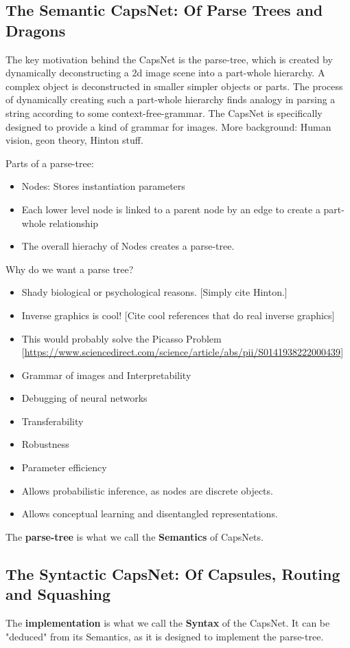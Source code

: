 \documentclass{article}
\begin{document}
\subsection{The Semantic CapsNet: Of Parse Trees and Dragons}

The key motivation behind the CapsNet is the parse-tree, which is created by dynamically deconstructing a 2d image scene into a part-whole hierarchy. A complex object is deconstructed in smaller simpler objects or parts.
The process of dynamically creating such a part-whole hierarchy finds analogy in parsing a string according to some context-free-grammar.
The CapsNet is specifically designed to provide a kind of grammar for images.
More background: Human vision, geon theory, Hinton stuff.

Parts of a parse-tree:
\begin{itemize}
	\item Nodes: Stores instantiation parameters
	\item Each lower level node is linked to a parent node by an edge to create a part-whole relationship
	\item The overall hierachy of Nodes creates a parse-tree.
\end{itemize}
Why do we want a parse tree?
\begin{itemize}
	\item Shady biological or psychological reasons. [Simply cite Hinton.]
	\item Inverse graphics is cool! [Cite cool references that do real inverse graphics]
	\item This would probably solve the Picasso Problem [\url{https://www.sciencedirect.com/science/article/abs/pii/S0141938222000439}]
	\item Grammar of images and Interpretability
	\item Debugging of neural networks
	\item Transferability
	\item Robustness
	\item Parameter efficiency
	\item Allows probabilistic inference, as nodes are discrete objects.
	\item Allows conceptual learning and disentangled representations.
\end{itemize}

The \textbf{parse-tree} is what we call the \textbf{Semantics} of CapsNets.

\subsection{The Syntactic CapsNet: Of Capsules, Routing and Squashing}
The \textbf{implementation} is what we call the \textbf{Syntax} of the CapsNet.
It can be "deduced" from its Semantics, as it is designed to implement the parse-tree.
\end{document}
